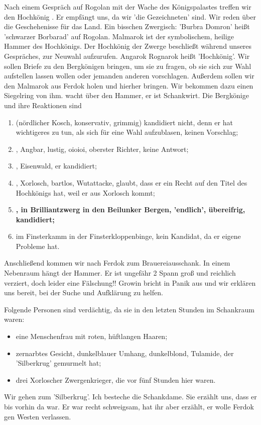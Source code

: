 Nach einem Gespräch auf Rogolan mit der Wache des Königspalastes treffen wir den Hochkönig . Er empfängt uns, da wir 'die Gezeichneten' sind. Wir reden über die Geschehenisse für das Land. Ein bisschen Zwergisch: 'Burbra Domron' heißt 'schwarzer Borbarad' auf Rogolan.  Malmarok ist der symbolischem, heilige Hammer des Hochkönigs. Der Hochkönig der Zwerge beschließt während unseres Gespräches, zur Neuwahl aufzurufen. Angarok Rognarok heißt 'Hochkönig'. Wir sollen Briefe zu den Bergkönigen bringen, um sie zu fragen, ob sie sich zur Wahl aufstellen lassen wollen oder jemanden anderen vorschlagen. Außerdem sollen wir den Malmarok aus Ferdok holen und hierher bringen. Wir bekommen dazu einen Siegelring von ihm.  wacht über den Hammer, er ist Schankwirt. 
Die Bergkönige und ihre Reaktionen sind
\begin{enumerate}
\item {} (nördlicher Kosch, konservativ, grimmig) kandidiert nicht, denn er hat wichtigeres zu tun, als sich für eine Wahl aufzublasen, keinen Vorschlag;
\item {}, Angbar, lustig, oioioi, oberster Richter, keine Antwort;
\item {}, Eisenwald, er kandidiert;
\item {},  Xorlosch, bartlos, Wutattacke, glaubt, dass er ein Recht auf den Titel des Hochkönigs hat, weil er aus Xorlosch kommt;
\item \bf{}\normalfont, in Brilliantzwerg in den Beilunker Bergen, 'endlich', übereifrig, kandidiert;
\item {} im Finsterkamm in der Finsterkloppenbinge, kein Kandidat, da er eigene Probleme hat. 
\end{enumerate}

Anschließend kommen wir nach Ferdok zum Brauereiausschank. In einem Nebenraum hängt der Hammer. Er ist ungefähr 2 Spann groß und reichlich verziert, doch leider eine Fälschung!! Growin bricht in Panik aus und wir erklären uns bereit, bei der Suche und Aufklärung zu helfen.  

Folgende Personen sind verdächtig, da sie in den letzten Stunden im Schankraum waren:
\begin{itemize}
\item eine Menschenfrau mit roten, hüftlangen Haaren;
\item zernarbtes Gesicht, dunkelblauer Umhang, dunkelblond, Tulamide, der 'Silberkrug' gemurmelt hat;
\item drei Xorloscher Zwergenkrieger, die vor fünf Stunden hier waren.  
\end{itemize}
Wir gehen zum 'Silberkrug'. Ich besteche die Schankdame. Sie erzählt uns, dass er bis vorhin da war. Er war recht schweigsam, hat ihr aber erzählt, er wolle Ferdok gen Westen verlassen.  

